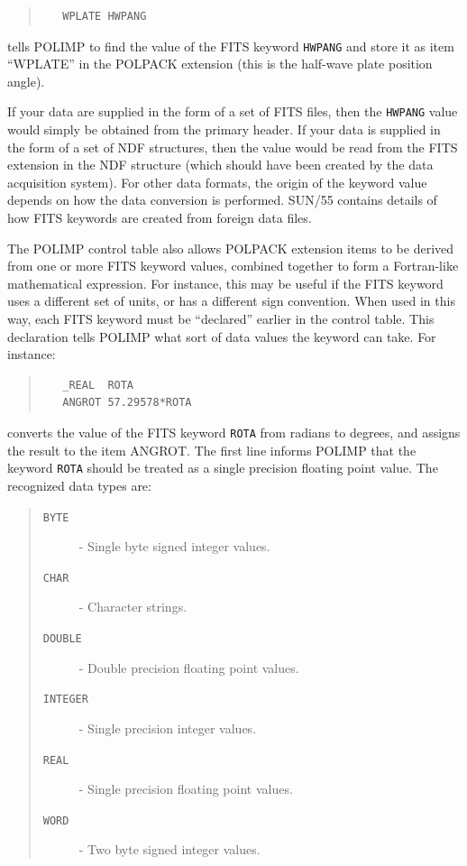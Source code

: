 \documentclass[twoside,11pt]{article}
\newcommand{\xref}[3]{#1}
\renewcommand{\_}{\texttt{\symbol{95}}}
\newenvironment{myquote}{\begin{quote}\begin{small}}{\end{small}\end{quote}}
\begin{document}
\begin{myquote}
\begin{verbatim}
   WPLATE HWPANG
\end{verbatim}
\end{myquote}

tells POLIMP to find the value of the FITS keyword \verb+HWPANG+ and
store it as item ``WPLATE'' in the POLPACK extension (this is the
half-wave plate position angle).

If your data are supplied in the form of a set of FITS files, then the
\verb+HWPANG+ value would simply be obtained from the primary header. If your
data is supplied in the form of a set of NDF structures, then the value
would be read from the FITS extension in the NDF structure (which should
have been created by the data acquisition system). For other data formats,
the origin of the keyword value depends on how the data conversion is
performed. \xref{SUN/55}{sun55}{} contains details of how FITS keywords
are created from foreign data files.

The POLIMP control table also allows POLPACK extension items to be
derived from one or more FITS keyword values, combined together to form a
Fortran-like mathematical expression. For instance, this may be useful if
the FITS keyword uses a different set of units, or has a different sign
convention. When used in this way, each FITS keyword must be ``declared''
earlier in the control table. This declaration tells POLIMP what sort of
data values the keyword can take. For instance:

\begin{myquote}
\begin{verbatim}
   _REAL  ROTA
   ANGROT 57.29578*ROTA
\end{verbatim}
\end{myquote}

converts the value of the FITS keyword \verb+ROTA+ from radians to
degrees, and assigns the result to the item ANGROT.
The first line informs POLIMP that the keyword \verb+ROTA+ should be
treated as a single precision floating point value. The recognized data
types are:

\begin{quote}
\begin{description}
\item[\texttt{\_BYTE}]		- Single byte signed integer values.
\item[\texttt{\_CHAR}]		- Character strings.
\item[\texttt{\_DOUBLE}]       	- Double precision floating point values.
\item[\texttt{\_INTEGER}]	- Single precision integer values.
\item[\texttt{\_REAL}]		- Single precision floating point values.
\item[\texttt{\_WORD}]		- Two byte signed integer values.
\end{description}
\end{quote}
\end{document}
